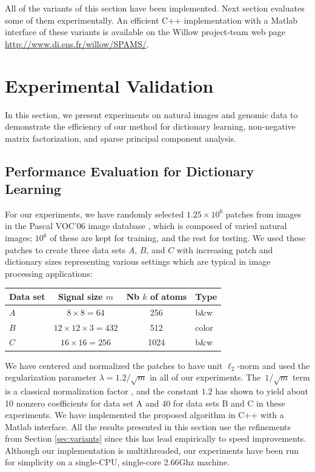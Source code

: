 \documentclass[twoside,11pt]{article}
\begin{document}
All of the variants of this section have been implemented. Next section evaluates some of
them experimentally. An efficient C++ implementation with a Matlab interface 
of these variants is available on the Willow project-team web page \url{http://www.di.ens.fr/willow/SPAMS/}.
\section{Experimental Validation} \label{sec:exp_dict}
In this section, we present experiments on natural images and genomic data to demonstrate the
efficiency of our method for dictionary learning, non-negative matrix factorization, and
sparse principal component analysis.
\subsection{Performance Evaluation for Dictionary Learning} \label{subsec:exp:perf}
For our experiments, we have randomly selected $1.25\times 10^6$ patches from
images in the Pascal VOC'06 image database \citep{pascal2}, which is composed of
varied natural images; $10^6$ of these are kept
for training, and the rest for testing. 
We used these patches to create three
data sets $A$, $B$, and $C$ with increasing patch and dictionary sizes
representing various settings which are typical in image processing applications:
\begin{table}[hbtp] 
   \centering
\begin{tabular}{|l|c|c|l|}\hline
Data set& Signal size $m$ & Nb $k$ of atoms  & Type\\ \hline
$A$ & $8\times 8=64$ & 256 & b\&w\\ \hline
$B$ & $12\times 12\times 3=432$ & 512 & color\\ \hline
$C$ & $16\times 16=256$ & 1024 & b\&w \\ \hline
\end{tabular}
\end{table}
We have centered and normalized the patches to have unit $\ell_2$-norm and used the
regularization parameter $\lambda=1.2/\sqrt{m}$ in all of our experiments. The~$1/\sqrt{m}$
term is a classical normalization factor \citep{tsybakov}, and the
constant $1.2$ has shown to yield about 10 nonzero
coefficients for data set A and 40 for data sets B and C in these experiments.
We have implemented the proposed algorithm in C++ with a Matlab interface. All
the results presented in this section use the refinements from Section
\ref{sec:variants} since this has lead empirically to speed improvements.
Although our implementation is multithreaded, our experiments have been run for
simplicity on a single-CPU, single-core 2.66Ghz machine.
\end{document}
